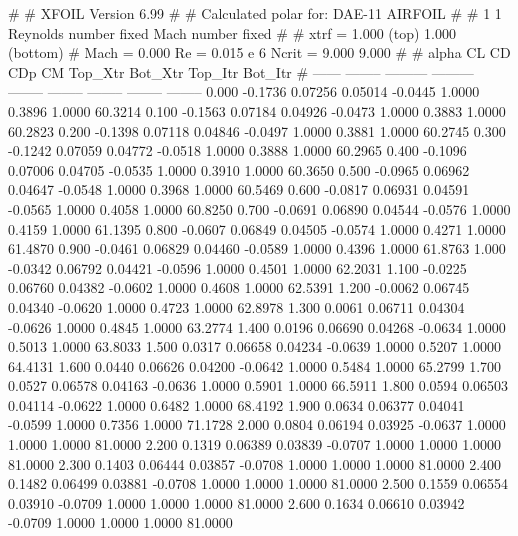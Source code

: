 #  
#       XFOIL         Version 6.99
#  
# Calculated polar for: DAE-11 AIRFOIL                                  
#  
# 1 1 Reynolds number fixed          Mach number fixed         
#  
# xtrf =   1.000 (top)        1.000 (bottom)  
# Mach =   0.000     Re =     0.015 e 6     Ncrit =   9.000  9.000
#  
#   alpha    CL        CD       CDp       CM     Top_Xtr  Bot_Xtr  Top_Itr  Bot_Itr
#  ------ -------- --------- --------- -------- -------- -------- -------- --------
   0.000  -0.1736   0.07256   0.05014  -0.0445   1.0000   0.3896   1.0000  60.3214
   0.100  -0.1563   0.07184   0.04926  -0.0473   1.0000   0.3883   1.0000  60.2823
   0.200  -0.1398   0.07118   0.04846  -0.0497   1.0000   0.3881   1.0000  60.2745
   0.300  -0.1242   0.07059   0.04772  -0.0518   1.0000   0.3888   1.0000  60.2965
   0.400  -0.1096   0.07006   0.04705  -0.0535   1.0000   0.3910   1.0000  60.3650
   0.500  -0.0965   0.06962   0.04647  -0.0548   1.0000   0.3968   1.0000  60.5469
   0.600  -0.0817   0.06931   0.04591  -0.0565   1.0000   0.4058   1.0000  60.8250
   0.700  -0.0691   0.06890   0.04544  -0.0576   1.0000   0.4159   1.0000  61.1395
   0.800  -0.0607   0.06849   0.04505  -0.0574   1.0000   0.4271   1.0000  61.4870
   0.900  -0.0461   0.06829   0.04460  -0.0589   1.0000   0.4396   1.0000  61.8763
   1.000  -0.0342   0.06792   0.04421  -0.0596   1.0000   0.4501   1.0000  62.2031
   1.100  -0.0225   0.06760   0.04382  -0.0602   1.0000   0.4608   1.0000  62.5391
   1.200  -0.0062   0.06745   0.04340  -0.0620   1.0000   0.4723   1.0000  62.8978
   1.300   0.0061   0.06711   0.04304  -0.0626   1.0000   0.4845   1.0000  63.2774
   1.400   0.0196   0.06690   0.04268  -0.0634   1.0000   0.5013   1.0000  63.8033
   1.500   0.0317   0.06658   0.04234  -0.0639   1.0000   0.5207   1.0000  64.4131
   1.600   0.0440   0.06626   0.04200  -0.0642   1.0000   0.5484   1.0000  65.2799
   1.700   0.0527   0.06578   0.04163  -0.0636   1.0000   0.5901   1.0000  66.5911
   1.800   0.0594   0.06503   0.04114  -0.0622   1.0000   0.6482   1.0000  68.4192
   1.900   0.0634   0.06377   0.04041  -0.0599   1.0000   0.7356   1.0000  71.1728
   2.000   0.0804   0.06194   0.03925  -0.0637   1.0000   1.0000   1.0000  81.0000
   2.200   0.1319   0.06389   0.03839  -0.0707   1.0000   1.0000   1.0000  81.0000
   2.300   0.1403   0.06444   0.03857  -0.0708   1.0000   1.0000   1.0000  81.0000
   2.400   0.1482   0.06499   0.03881  -0.0708   1.0000   1.0000   1.0000  81.0000
   2.500   0.1559   0.06554   0.03910  -0.0709   1.0000   1.0000   1.0000  81.0000
   2.600   0.1634   0.06610   0.03942  -0.0709   1.0000   1.0000   1.0000  81.0000
